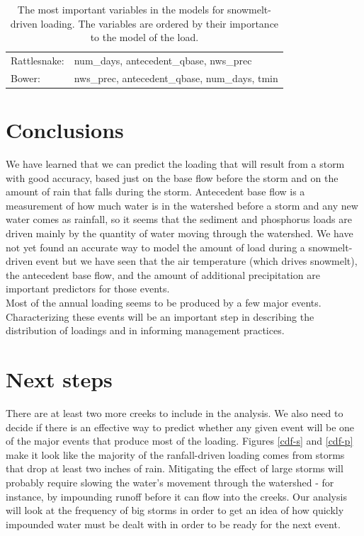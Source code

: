 \documentclass[12pt]{article}
\begin{document}
\begin{table}[h!]
\begin{center}
\begin{tabular}{ll}
        \hspace{5mm} Rattlesnake: & num\_days, antecedent\_qbase, nws\_prec\\
        \hspace{5mm} Bower: & nws\_prec, antecedent\_qbase, num\_days, tmin\\
    \end{tabular}
    \caption{The most important variables in the models for snowmelt-driven loading. The variables are ordered by their importance to the model of the load. \label{snow_predictor_list}}
    \end{center}
\end{table}

\section{Conclusions}
We have learned that we can predict the loading that will result from a storm with good accuracy, based just on the base flow before the storm and on the amount of rain that falls during the storm. Antecedent base flow is a measurement of how much water is in the watershed before a storm and any new water comes as rainfall, so it seems that the sediment and phosphorus loads are driven mainly by the quantity of water moving through the watershed. We have not yet found an accurate way to model the amount of load during a snowmelt-driven event but we have seen that the air temperature (which drives snowmelt), the antecedent base flow, and the amount of additional precipitation are important predictors for those events.\\

Most of the annual loading seems to be produced by a few major events. Characterizing these events will be an important step in describing the distribution of loadings and in informing management practices.\\

\section{Next steps}
There are at least two more creeks to include in the analysis. We also need to decide if there is an effective way to predict whether any given event will be one of the major events that produce most of the loading. Figures \ref{cdf-s} and \ref{cdf-p} make it look like the majority of the ranfall-driven loading comes from storms that drop at least two inches of rain. Mitigating the effect of large storms will probably require slowing the water's movement through the watershed - for instance, by impounding runoff before it can flow into the creeks. Our analysis will look at the frequency of big storms in order to get an idea of how quickly impounded water must be dealt with in order to be ready for the next event.
\end{document}
